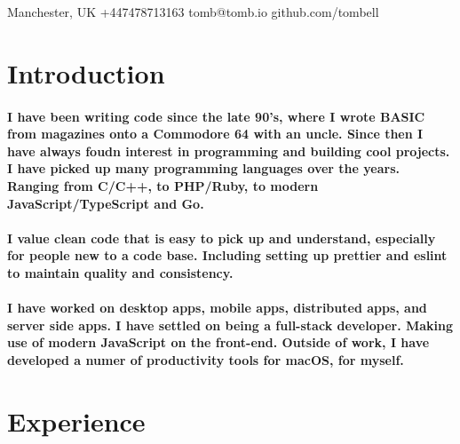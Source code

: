 \documentclass[a4paper]{article}
\author{Tom Bell}
\renewcommand{\maketitle}{
  \begin{center}
    \huge{\textbf\theauthor}
  \end{center}
}
\begin{document}
\maketitle

\begin{center}
  \raisebox{0\height}{\small\faMapMarker} Manchester, UK
  \hspace{1 cm}
  \raisebox{-0.1\height}{\small\faMobile} +447478713163
  \hspace{1 cm}
  \raisebox{-0.1\height}{\small\faEnvelope} tomb@tomb.io
  \hspace{1 cm}
  \raisebox{-0.1\height}{\small\faGithubAlt} github.com/tombell
\end{center}

\section{Introduction}
\paragraph{I have been writing code since the late 90's, where I wrote BASIC from magazines onto a Commodore 64 with an uncle. Since then I have always foudn interest in programming and building cool projects. I have picked up many programming languages over the years. Ranging from C/C++, to PHP/Ruby, to modern JavaScript/TypeScript and Go.}

\paragraph{I value clean code that is easy to pick up and understand, especially for people new to a code base. Including setting up prettier and eslint to maintain quality and consistency.}

\paragraph{I have worked on desktop apps, mobile apps, distributed apps, and server side apps. I have settled on being a full-stack developer. Making use of modern JavaScript on the front-end. Outside of work, I have developed a numer of productivity tools for macOS, for myself.}

\section{Experience}
\end{document}
